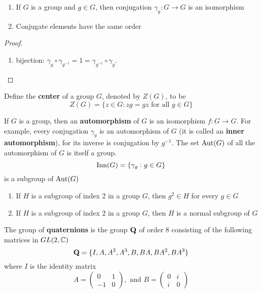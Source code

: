\documentclass[11pt]{article}
\begin{document}
\begin{proposition}[]
\begin{enumerate}
\item If \(G\) is a group and \(g\in G\), then conjugation \(\gamma_g:G\to G\) is an
isomorphism
\item Conjugate elements have the same order
\end{enumerate}
\end{proposition}

\begin{proof}
\begin{enumerate}
\item bijection: \(\gamma_g\circ\gamma_{g^{-1}}=1=\gamma_{g^{-1}}\circ\gamma_g\).
\end{enumerate}
\end{proof}

\begin{examplle}[]
Define the \textbf{center} of a group \(G\), denoted by \(Z(G)\), to be
\begin{equation*}
Z(G)=\{z\in G:zg=gz\text{ for all }g\in G\}
\end{equation*}
\end{examplle}

\begin{examplle}[]
If \(G\) is a group, then an \textbf{automorphism} of \(G\) is an isomorphism \(f:G\to G\).
For example, every conjugation \(\gamma_g\) is an automorphism of \(G\) (it is
called an \textbf{inner automorphism}), for its inverse is conjugation by \(g^{-1}\).
The set \(\operatorname{Aut}(G)\) of all the automorphism of \(G\) is itself a group.
\begin{equation*}
\operatorname{Inn}(G)=\{\gamma_g:g\in G\}
\end{equation*}
is a subgroup of \(\operatorname{Aut}(G)\)
\end{examplle}
\begin{proposition}[]
\begin{enumerate}
\item If \(H\) is a subgroup of index 2 in a group \(G\), then \(g^2\in H\) for every
\(g\in G\)
\item If \(H\) is a subgroup of index 2 in a group \(G\), then \(H\) is a normal
subgroup of \(G\)
\end{enumerate}
\end{proposition}


\begin{definition}[]
The group of \textbf{quaternions} is the group \(\operatorname{\textbf{Q}}\) of order 8 consisting of the
following matrices in \(GL(2, \mathbb{C})\)
\begin{equation*}
\operatorname{\textbf{Q}}=\{I,A,A^2,A^3,B,BA,BA^2,BA^3\}
\end{equation*}
where \(I\) is the identity matrix
\begin{equation*}
A=
\begin{pmatrix}
0&1\\
-1&0
\end{pmatrix}, \text{ and }
B=\begin{pmatrix}
0&i\\
i&0
  \end{pmatrix}
\end{equation*}
\end{definition}
\end{document}
